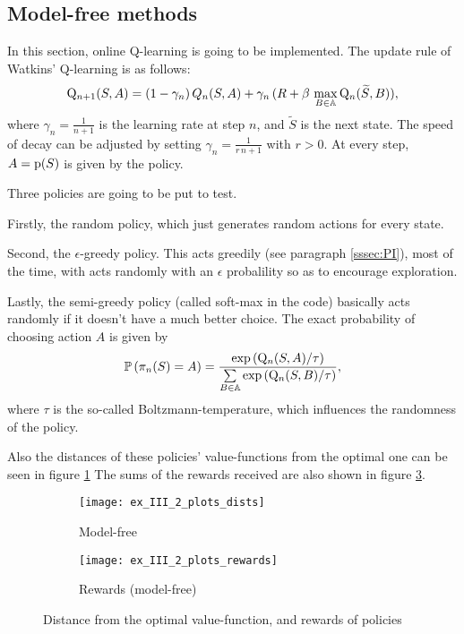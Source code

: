 \subsection{Model-free methods}

In this section, online Q-learning is going to be implemented.
The update rule of Watkins' Q-learning is as follows:
\begin{equation}
	\mathrm{Q}_{n+1}(S,A)=(1-\gamma_n)\,Q_n(S, A) + \gamma_n\,(R + \beta\,\max\limits_{B\in\mathbb{A}}\mathrm{Q}_n(\widetilde{S},B)),
\end{equation}
where $\gamma_n=\frac{1}{n+1}$ is the learning rate at step $n$,
and $\widetilde{S}$ is the next state. The speed of decay can be adjusted by setting
$\gamma_n=\frac{1}{r\,n+1}$ with $r>0$.
At every step, $A=\mathrm{p}(S)$ is given by the policy.

Three policies are going to be put to test.

Firstly, the random policy, which just generates random actions for every state.

Second, the $\epsilon$-greedy policy. This acts greedily (see paragraph \ref{sssec:PI}),
most of the time, with acts randomly with an $\epsilon$ probalility so as to
encourage exploration.

Lastly, the semi-greedy policy (called soft-max in the code) basically acts randomly
if it doesn't have a much better choice. The exact probability of choosing action $A$
is given by
\begin{equation}
	\mathbb{P}\left(\pi_n(S)=A\right) =
	\frac{\exp\left(\mathrm{Q}_n(S, A)/\tau\right)}
	{\sum\limits_{B\in\mathbb{A}}\exp\left(\mathrm{Q}_n(S, B)/\tau\right)},
\end{equation}
where $\tau$ is the so-called Boltzmann-temperature, which influences
the randomness of the policy.

Also the distances of these policies' value-functions from the optimal one
can be seen in figure \ref{fig:dist-2}
The sums of the rewards received are also shown in figure \ref{fig:rewards}.

\begin{figure}[H]
	\centering
	\begin{subfigure}{.45\textwidth}
		\centering
		\texttt{[image: ex\_III\_2\_plots\_dists]}
		\caption{Model-free}
		\label{fig:dist-2}
	\end{subfigure}
	\begin{subfigure}{.45\textwidth}
		\centering
		\texttt{[image: ex\_III\_2\_plots\_rewards]}
		\caption{Rewards (model-free)}
		\label{fig:rewards}
	\end{subfigure}
	\caption{Distance from the optimal value-function, and rewards of policies}
\end{figure}


